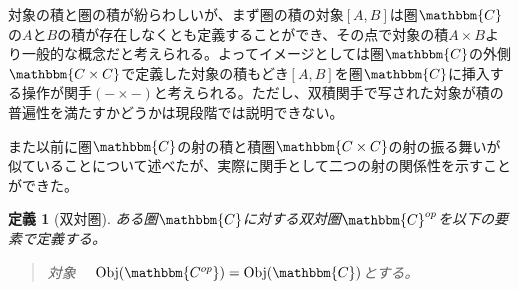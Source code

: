 \documentclass[uplatex,dvipdfmx]{jsarticle}
\newcommand{\cat}[1]{\mathbbm{#1}}
\newcommand{\obj}[1]{\mathrm{Obj}(\cat{#1})}
\newcommand{\pcobj}[1]{[#1]}
\newtheorem{define}[proof]{定義}
\numberwithin{proof}{subsection}
\newenvironment{mydescription}
{\begin{description}
  \setlength{\parskip}{0.5cm}
}
{\end{description}}
\begin{document}
	対象の積と圏の積が紛らわしいが、まず圏の積の対象$\pcobj{A,B}$は圏$\cat{C}$の$A$と$B$の積が存在しなくとも定義することができ、その点で対象の積$A\times B$より一般的な概念だと考えられる。よってイメージとしては圏$\cat{C}$の外側$\cat{C\times C}$で定義した対象の積もどき$[A,B]$を圏$\cat{C}$に挿入する操作が関手$(-\times-)$と考えられる。ただし、双積関手で写された対象が積の普遍性を満たすかどうかは現段階では説明できない。

	また以前に圏$\cat{C}$の射の積と積圏$\cat{C\times C}$の射の振る舞いが似ていることについて述べたが、実際に関手として二つの射の関係性を示すことができた。
	\begin{define}[双対圏]
		ある圏$\cat{C}$に対する双対圏$\cat{C}^{op}$を以下の要素で定義する。
		\begin{quote}
			\begin{mydescription}
				\item[対象]　$\obj{C^{op}}=\obj{C}$とする。


\end{mydescription}
\end{quote}
\end{define}
\end{document}
